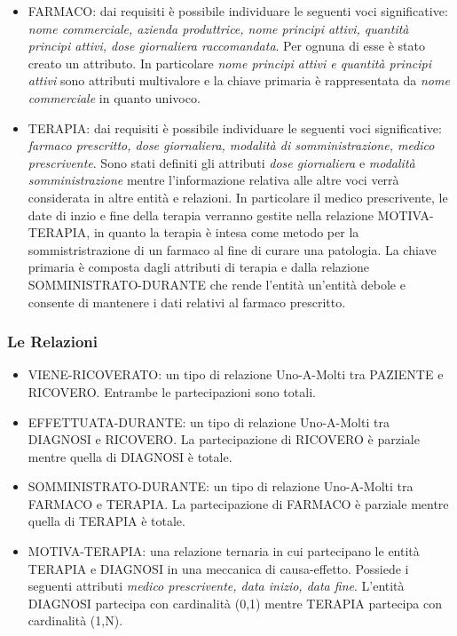 \documentclass{article}
\begin{document}
\begin{itemize}
    \item FARMACO: dai requisiti è possibile individuare le seguenti voci
          significative: \textit{nome commerciale, azienda produttrice, 
          nome principi attivi, quantità principi attivi, dose giornaliera
          raccomandata}. Per ognuna di esse è stato creato un attributo. In
          particolare \textit{nome principi attivi e quantità principi 
          attivi} sono attributi multivalore e la chiave primaria è 
          rappresentata da \textit{nome commerciale} in quanto univoco.
          
    \item TERAPIA: dai requisiti è possibile individuare le seguenti voci
          significative: \textit{farmaco prescritto, dose giornaliera, 
          modalità di somministrazione, medico prescrivente}. 
          Sono stati definiti gli attributi \textit{dose giornaliera} e 
          \textit{modalità somministrazione} mentre l'informazione relativa
          alle altre voci verrà considerata in altre entità e relazioni.
          In particolare il medico prescrivente, le date di inzio e fine 
          della terapia verranno gestite nella relazione MOTIVA-TERAPIA,
          in quanto la terapia è intesa come metodo per la sommistristrazione 
          di un farmaco al fine di curare una patologia. La 
          chiave primaria è composta dagli attributi di terapia e dalla
          relazione SOMMINISTRATO-DURANTE che rende l'entità un'entità
          debole e consente di mantenere i dati relativi al farmaco prescritto.



\end{itemize}

\subsubsection{Le Relazioni}
\begin{itemize}
    \item VIENE-RICOVERATO: un tipo di relazione Uno-A-Molti tra PAZIENTE e
          RICOVERO. Entrambe le partecipazioni sono totali.
    
    \item EFFETTUATA-DURANTE: un tipo di relazione Uno-A-Molti tra DIAGNOSI 
          e RICOVERO. La partecipazione di RICOVERO è parziale mentre quella
          di DIAGNOSI è totale.

    \item SOMMINISTRATO-DURANTE: un tipo di relazione Uno-A-Molti tra FARMACO
          e TERAPIA. La partecipazione di FARMACO è parziale mentre quella di
          TERAPIA è totale.
    
    \item MOTIVA-TERAPIA: una relazione ternaria in cui partecipano le entità
          TERAPIA e DIAGNOSI in una meccanica di causa-effetto. Possiede i
          seguenti attributi \textit{medico prescrivente, data inizio, data  fine}. 
          L'entità DIAGNOSI partecipa con cardinalità (0,1) mentre TERAPIA 
          partecipa con cardinalità (1,N).
\end{itemize}      
            
\end{document}
